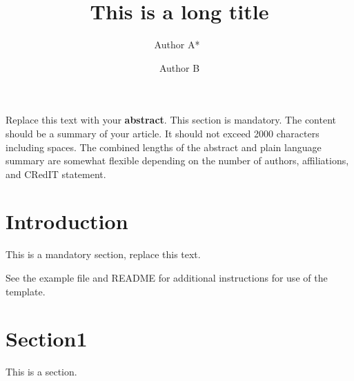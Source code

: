 \documentclass[preprint]{sedimentologika}
\title{This is a long title} %
\author[1,2]{Author A*~\orcidlink{0000-0002-2771-9344}}
\author[1]{Author B}
\affil[1]{Affiliation 1}
\affil[2]{Affiliation 2}
\begin{document}

{%
  Replace this text with your \textbf{abstract}.
  This section is mandatory.
  The content should be a summary of your article.
  It should not exceed 2000 characters including spaces.
  The combined lengths of the abstract and plain language summary are somewhat flexible depending on the number of authors, affiliations, and CRedIT statement.
}
{%
}


\section{Introduction}
This is a mandatory section, replace this text.

See the example file and README for additional instructions for use of the template.

\section{Section1}
This is a section.
\end{document}
